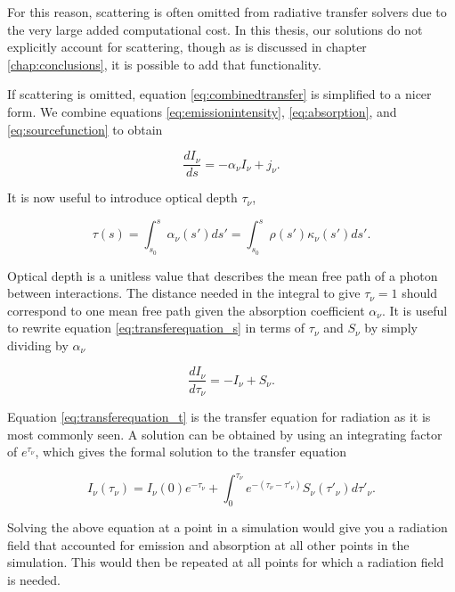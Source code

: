 For this reason, scattering is often omitted from radiative transfer solvers due to the very large added computational cost. In this thesis, our solutions do not explicitly account for scattering, though as is discussed in chapter \ref{chap:conclusions}, it is possible to add that functionality.

If scattering is omitted, equation \ref{eq:combinedtransfer} is simplified to a nicer form. We combine equations \ref{eq:emissionintensity}, \ref{eq:absorption}, and \ref{eq:sourcefunction} to obtain

\begin{equation}
\label{eq:transferequation_s}
\frac{dI_{\nu}}{ds} = -\alpha_{\nu}I_{\nu} + j_{\nu}.
\end{equation}

It is now useful to introduce optical depth $\tau_{\nu}$,

\begin{equation}
\label{eq:opticaldepth}
\tau(s) = \int_{s_0}^{s} \alpha_{\nu}(s')ds' = \int_{s_0}^{s} \rho(s') \kappa_{\nu}(s') ds'.
\end{equation}

Optical depth is a unitless value that describes the mean free path of a photon between interactions. The distance needed in the integral to give $\tau_{\nu} = 1$ should correspond to one mean free path given the absorption coefficient $\alpha_{\nu}$. It is useful to rewrite equation \ref{eq:transferequation_s} in terms of $\tau_{\nu}$ and $S_{\nu}$ by simply dividing by $\alpha_{\nu}$

\begin{equation}
\label{eq:transferequation_t}
\frac{dI_{\nu}}{d\tau_{\nu}} = -I_{\nu} + S_{\nu}.
\end{equation}

Equation \ref{eq:transferequation_t} is the transfer equation for radiation as it is most commonly seen. A solution can be obtained by using an integrating factor of $e^{\tau_{\nu}}$, which gives the formal solution to the transfer equation

\begin{equation}
\label{eq:transferequationsolution}
I_{\nu}(\tau_{\nu}) = I_{\nu}(0)e^{-\tau_{\nu}} + \int_0^{\tau_{\nu}} e^{-(\tau_\nu - \tau'_{\nu})} S_{\nu}(\tau'_{\nu})d\tau'_{\nu}.
\end{equation}

Solving the above equation at a point in a simulation would give you a radiation field that accounted for emission and absorption at all other points in the simulation. This would then be repeated at all points for which a radiation field is needed.

